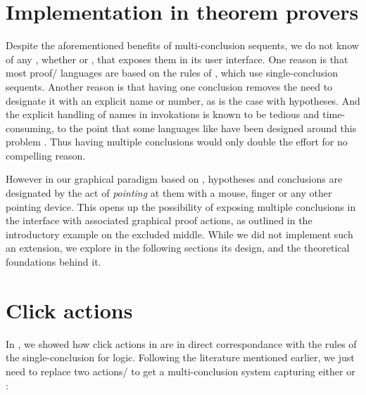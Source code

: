 \section{Implementation in theorem provers}

Despite the aforementioned benefits of multi-conclusion sequents, we do not know
of any , whether  or , that exposes them
in its user interface. One reason is that most proof/ languages are based
on the rules of , which use single-conclusion sequents. Another
reason is that having one conclusion removes the need to designate it with an
explicit name or number, as is the case with hypotheses. And the explicit handling
of names in  invokations is known to be tedious and time-consuming, to the
point that some  languages like \ssreflect have been designed around this
problem . Thus having multiple conclusions would only double the
effort for no compelling reason.

However in our graphical paradigm based on , hypotheses and
conclusions are designated by the act of \emph{pointing} at them with a mouse,
finger or any other pointing device. This opens up the possibility of exposing
multiple conclusions in the interface with associated graphical proof actions,
as outlined in the introductory example on the excluded middle. While we did not
implement such an extension, we explore in the following sections its design,
and the theoretical foundations behind it.

\section{Click actions}

In , we showed how click actions in  are in direct
correspondance with the rules of the single-conclusion  
for  logic. Following the literature mentioned earlier, we just
need to replace two actions/ to get a multi-conclusion system
capturing either  or  :

